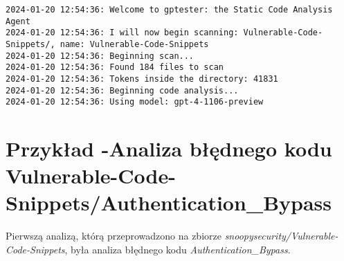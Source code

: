 \begin{verbatim}
2024-01-20 12:54:36: Welcome to gptester: the Static Code Analysis Agent
2024-01-20 12:54:36: I will now begin scanning: Vulnerable-Code-Snippets/, name: Vulnerable-Code-Snippets
2024-01-20 12:54:36: Beginning scan...
2024-01-20 12:54:36: Found 184 files to scan
2024-01-20 12:54:36: Tokens inside the directory: 41831
2024-01-20 12:54:36: Beginning code analysis...
2024-01-20 12:54:36: Using model: gpt-4-1106-preview
\end{verbatim}

\section{Przykład -Analiza błędnego kodu Vulnerable-Code-Snippets/Authentication\_Bypass}
\label{sec:analiza_blednego_kodu}
Pierwszą analizą, którą przeprowadzono na zbiorze \textit{snoopysecurity/Vulnerable-Code-Snippets}, była analiza błędnego kodu \textit{Authentication\_Bypass}. 

